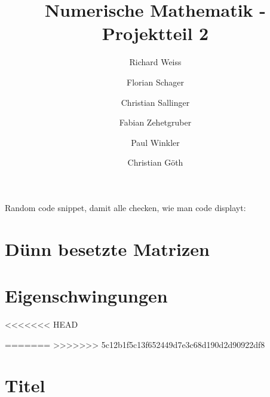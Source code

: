 \documentclass{article}
\title{Numerische Mathematik - Projektteil 2}
\author
{
  Richard Weiss       \and
  Florian Schager     \and
  Christian Sallinger \and
  Fabian Zehetgruber  \and
  Paul Winkler        \and
  Christian Göth
}
\date{}
\begin{document}
\maketitle

Random code snippet, damit alle checken, wie man code displayt:


\section{Dünn besetzte Matrizen}

\FloatBarrier
\section{Eigenschwingungen}
<<<<<<< HEAD

=======
%
>>>>>>> 5c12b1f5c13f652449d7e3c68d190d2d90922df8
\FloatBarrier
\section{Titel}

\end{document}
